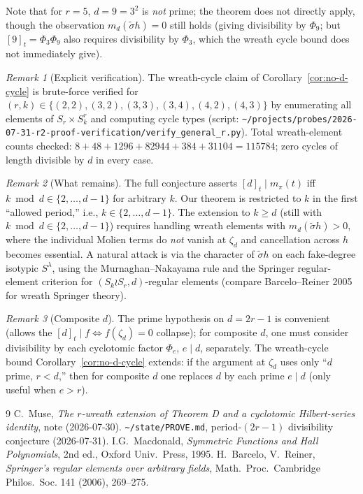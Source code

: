 \documentclass[11pt]{article}
\theoremstyle{definition}
\theoremstyle{remark}
\newtheorem*{remark}{Remark}
\begin{document}
Note that for $r = 5$, $d = 9 = 3^2$ is \emph{not} prime; the theorem
does not directly apply, though the observation $m_d(\tilde\sigma h) = 0$
still holds (giving divisibility by $\Phi_9$; but $[9]_t = \Phi_3 \Phi_9$
also requires divisibility by $\Phi_3$, which the wreath cycle bound
does not immediately give).

\begin{remark}[Explicit verification]
The wreath-cycle claim of Corollary~\ref{cor:no-d-cycle} is
brute-force verified for $(r, k) \in \{(2,2), (3,2), (3,3), (3,4),
(4,2), (4,3)\}$ by enumerating all elements of $S_r \times S_k^r$ and
computing cycle types (script:
\texttt{\~{}/projects/probes/2026-07-31-r2-proof-verification/verify\_general\_r.py}).
Total wreath-element counts checked:
$8 + 48 + 1296 + 82944 + 384 + 31104 = 115784$; zero cycles of length
divisible by $d$ in every case.
\end{remark}

\begin{remark}[What remains]
The full conjecture asserts $[d]_t \mid m_\pi(t)$ iff
$k \bmod d \in \{2, \ldots, d-1\}$ for arbitrary $k$. Our theorem is
restricted to $k$ in the first ``allowed period,'' i.e., $k \in \{2,
\ldots, d-1\}$. The extension to $k \ge d$ (still with $k \bmod d \in
\{2, \ldots, d-1\}$) requires handling wreath elements with
$m_d(\tilde\sigma h) > 0$, where the individual Molien terms do
\emph{not} vanish at $\zeta_d$ and cancellation across $h$ becomes
essential. A natural attack is via the character of $\tilde\sigma h$ on
each fake-degree isotypic $S^\lambda$, using the Murnaghan--Nakayama
rule and the Springer regular-element criterion for
$(S_k \wr S_r, d)$-regular elements (compare Barcelo--Reiner 2005 for
wreath Springer theory).
\end{remark}

\begin{remark}[Composite $d$]
The prime hypothesis on $d = 2r - 1$ is convenient (allows the
$[d]_t \mid f \Leftrightarrow f(\zeta_d) = 0$ collapse); for composite
$d$, one must consider divisibility by each cyclotomic factor
$\Phi_e$, $e \mid d$, separately. The wreath-cycle bound
Corollary~\ref{cor:no-d-cycle} extends: if the argument at $\zeta_d$ uses
only ``$d$ prime, $r < d$,'' then for composite $d$ one replaces $d$ by
each prime $e \mid d$ (only useful when $e > r$).
\end{remark}


\begin{thebibliography}{9}
 C.\ Muse, \emph{The $r$-wreath extension of
Theorem D and a cyclotomic Hilbert-series identity}, note (2026-07-30).
 \texttt{\~{}/state/PROVE.md}, period-$(2r-1)$
divisibility conjecture (2026-07-31).
 I.G.~Macdonald, \emph{Symmetric Functions and Hall
Polynomials}, 2nd ed., Oxford Univ.~Press, 1995.
 H.~Barcelo, V.~Reiner, \emph{Springer's regular
elements over arbitrary fields}, Math.~Proc.~Cambridge Philos.~Soc. 141
(2006), 269--275.
\end{thebibliography}
\end{document}
